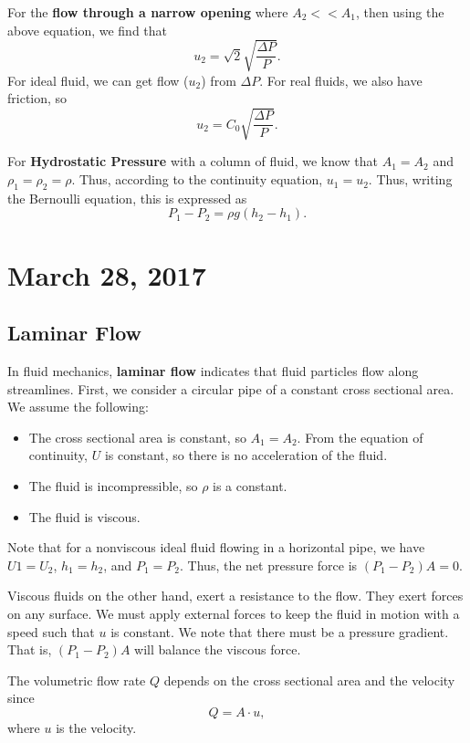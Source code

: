 \documentclass[11pt]{article}
\theoremstyle{plain} %
\theoremstyle{definition}
\theoremstyle{example}
\theoremstyle{remark}
\begin{document}
\begin{itemize}
	For the \textbf{flow through a narrow opening} where $A_2 << A_1$, then using the above equation, we find that 
	$$u_2 = \sqrt 2 \sqrt{\frac{\Delta P}{P}}.$$
	For ideal fluid, we can get flow ($u_2$) from $\Delta P$. For real fluids, we also have friction, so 
	$$u_2 = C_0\sqrt{\frac{\Delta P}{P}}.$$
	
	For \textbf{Hydrostatic Pressure} with a column of fluid, we know that $A_1=A_2$ and $\rho_1=\rho_2=\rho$. Thus, according to the continuity equation, $u_1 = u_2$. Thus, writing the Bernoulli equation, this is expressed as 
	$$P_1-P_2 = \rho g(h_2-h_1).$$
\end{itemize}
	
\section{March 28, 2017}
\subsection{Laminar Flow} 

In fluid mechanics, \textbf{laminar flow} indicates that fluid particles flow along streamlines. First, we consider a circular pipe of a constant cross sectional area. 
We assume the following:
\begin{itemize}	
	\item The cross sectional area is constant, so $A_1 = A_2$. From the equation of continuity, $U$ is constant, so there is no acceleration of the fluid. 
	\item The fluid is incompressible, so $\rho$ is a constant. 
	\item The fluid is viscous. 
\end{itemize}
	
Note that for a nonviscous ideal fluid flowing in a horizontal pipe, we have $U1 = U_2$, $h_1 = h_2$, and $P_1 = P_2$. Thus, the net pressure force is $(P_1-P_2)A = 0$. 

Viscous fluids on the other hand, exert a resistance to the flow. They exert forces on any surface. We must apply external forces to keep the fluid in motion with a speed such that $u$ is constant. We note that there must be a pressure gradient. That is, $(P_1-P_2)A$ will balance the viscous force. 

The volumetric flow rate $Q$ depends on the cross sectional area and the velocity since 
$$Q = A\cdot u,$$
where $u$ is the velocity. 
	
\end{document}
